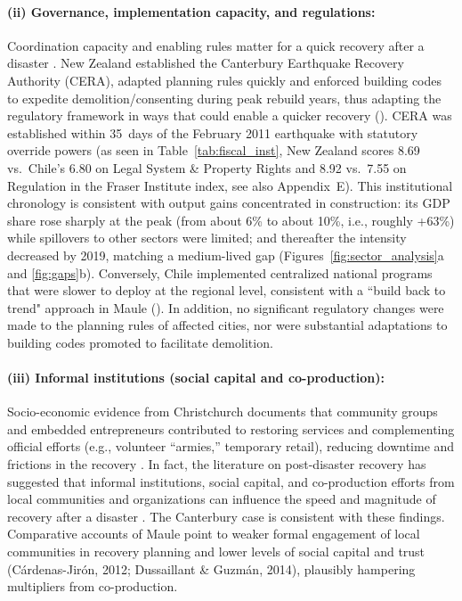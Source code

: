 \documentclass[12pt]{article}
\begin{document}
\paragraph{(ii) Governance, implementation capacity, and regulations:} Coordination capacity and enabling rules matter for a quick recovery after a disaster \parencite{storr2016community, storr2017sandy, rayamajhee2022coproduction}. New Zealand established the Canterbury Earthquake Recovery Authority (CERA), adapted planning rules quickly and enforced building codes to expedite demolition/consenting during peak rebuild years, thus adapting the regulatory framework in ways that could enable a quicker recovery (\cite{miller2013estimating, doyle2015short}). CERA was established within 35~days of the February 2011 earthquake with statutory override powers (as seen in Table~\ref{tab:fiscal_inst}, New Zealand scores 8.69 vs.\ Chile's 6.80 on Legal System \& Property Rights and 8.92 vs.\ 7.55 on Regulation in the Fraser Institute index, see also Appendix~E). This institutional chronology is consistent with output gains concentrated in construction: its GDP share rose sharply at the peak (from about 6\% to about 10\%, i.e., roughly +63\%) while spillovers to other sectors were limited; and thereafter the intensity decreased by 2019, matching a medium-lived gap (Figures~\ref{fig:sector_analysis}a and \ref{fig:gaps}b). Conversely, Chile implemented centralized national programs that were slower to deploy at the regional level, consistent with a “build back to trend" approach in Maule (\cite{eclac2010overview, cardenas2018talca, cardenasjiron2012chilean}). In addition, no significant regulatory changes were made to the planning rules of affected cities, nor were substantial adaptations to building codes promoted to facilitate demolition.

\paragraph{(iii) Informal institutions (social capital and co-production):} Socio-economic evidence from Christchurch documents that community groups and embedded entrepreneurs contributed to restoring services and complementing official efforts (e.g., volunteer “armies,” temporary retail), reducing downtime and frictions in the recovery \parencite{GrubeStorr2018, parker2016five}. In fact, the literature on post-disaster recovery has suggested that informal institutions, social capital, and co-production efforts from local communities and organizations can influence the speed and magnitude of recovery after a disaster \parencite{storr2016community, storr2017sandy, rayamajhee2022coproduction}. The Canterbury case is consistent with these findings. Comparative accounts of Maule point to weaker formal engagement of local communities in recovery planning and lower levels of social capital and trust (Cárdenas-Jirón, 2012; Dussaillant \& Guzmán, 2014), plausibly hampering multipliers from co-production.
\end{document}
